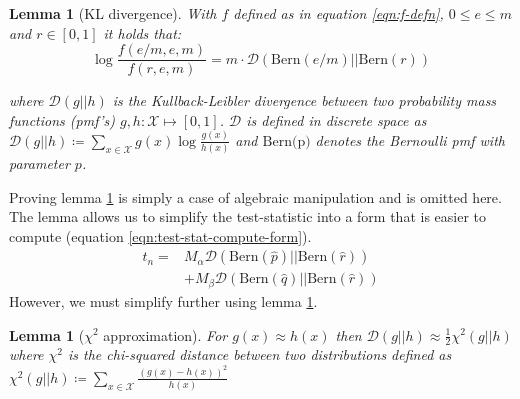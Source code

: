 \documentclass[11pt]{article}
\newcommand{\Xcal}{\mathcal{X}}
\newcommand{\kl}{\mathcal{D}}
\newtheorem{lemma}[theorem]{Lemma}
\begin{document}
\begin{multicols*}{2}
\begin{lemma}[KL divergence]
	With $f$ defined as in equation \ref{eqn:f-defn}, $0 \leq e \leq m$ and $r \in [0, 1]$ it holds that:
	\begin{equation*}
		\log \frac{f(e/m, e, m)}{f(r, e, m)} = m \cdot \kl \left( \textrm{Bern}(e/m) || \textrm{Bern}(r) \right)
	\end{equation*}

	where $\kl(g || h)$ is the Kullback-Leibler divergence between two probability mass functions (pmf's) $g, h: \Xcal \mapsto [0, 1]$. $\kl$ is defined in discrete space as $\kl(g || h) \coloneqq \sum_{x \in \Xcal} g(x) \log \frac{g(x)}{h(x)}$ and $\textrm{Bern(p)}$ denotes the Bernoulli pmf with parameter $p$.
	\label{lem:kl-div}
\end{lemma}

Proving lemma \ref{lem:kl-div} is simply a case of algebraic manipulation and is omitted here. The lemma allows us to simplify the test-statistic into a form that is easier to compute (equation \ref{eqn:test-stat-compute-form}).
%
\begin{equation}
	\begin{aligned}
	t_n = &M_\alpha \kl\left( \textrm{Bern}(\hat{p}) || \textrm{Bern}(\hat{r})\right) \\
	&+ M_\beta \kl\left( \textrm{Bern}(\hat{q}) || \textrm{Bern}(\hat{r})\right)
	\end{aligned}
	\label{eqn:test-stat-compute-form}
\end{equation}
%
However, we must simplify further using lemma \ref{lem:kl-approx-chi}.
%
\begin{lemma}[$\chi^2$ approximation]
	\label{lem:kl-approx-chi}
	For $g(x) \approx h(x)$ then $\kl(g || h) \approx \frac{1}{2} \chi^2(g || h)$ where $\chi^2$ is the chi-squared distance between two distributions defined as $\chi^2(g || h) \coloneqq \sum_{x \in \Xcal} \frac{(g(x)-h(x))^2}{h(x)}$ 
\end{lemma}


\end{multicols*}
\end{document}
